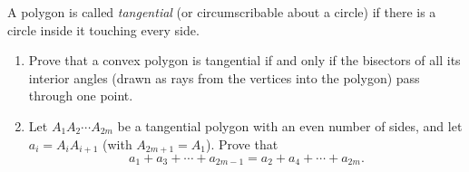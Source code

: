 A polygon is called \emph{tangential} (or circumscribable about a circle) if there is a circle inside it touching every side.
\begin{enumerate}
\item[(a)] Prove that a convex polygon is tangential if and only if the bisectors of all its interior angles (drawn as rays from the vertices into the polygon) pass through one point.
\item[(b)] Let $A_1A_2\cdots A_{2m}$ be a tangential polygon with an even number of sides, and let $a_i=A_iA_{i+1}$ (with $A_{2m+1}=A_1$). Prove that
\[a_1+a_3+\cdots+a_{2m-1}=a_2+a_4+\cdots+a_{2m}.\]
\end{enumerate}

